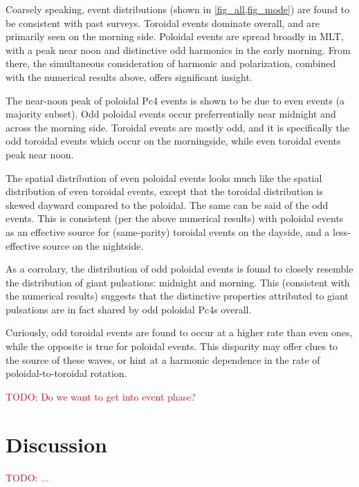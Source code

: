 \documentclass{article}
\newcommand{\todo}[1]{ \textcolor{red}{TODO: #1} }
\begin{document}
Coarsely speaking, event distributions (shown in \cref{fig_all,fig_mode}) are found to be consistent with past surveys. Toroidal events dominate overall, and are primarily seen on the morning side. Poloidal events are spread broadly in MLT, with a peak near noon and distinctive odd harmonics in the early morning. From there, the simultaneous consideration of harmonic and polarization, combined with the numerical results above, offers significant insight.

The near-noon peak of poloidal Pc4 events is shown to be due to even events (a majority subset). Odd poloidal events occur preferrentially near midnight and across the morning side. Toroidal events are mostly odd, and it is specifically the odd toroidal events which occur on the morningside, while even toroidal events peak near noon.

The spatial distribution of even poloidal events looks much like the spatial distribution of even toroidal events, except that the toroidal distribution is skewed dayward compared to the poloidal. The same can be said of the odd events. This is consistent (per the above numerical results) with poloidal events as an effective source for (same-parity) toroidal events on the dayside, and a less-effective source on the nightside.

As a corrolary, the distribution of odd poloidal events is found to closely resemble the distribution of giant pulsations: midnight and morning. This (consistent with the numerical results) suggests that the distinctive properties attributed to giant pulsations are in fact shared by odd poloidal Pc4s overall.

Curiously, odd toroidal events are found to occur at a higher rate than even ones, while the opposite is true for poloidal events. This disparity may offer clues to the source of these waves, or hint at a harmonic dependence in the rate of poloidal-to-toroidal rotation.

\todo{Do we want to get into event phase?}


\section{Discussion}

\todo{...}
\end{document}
